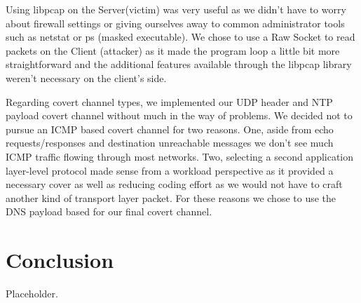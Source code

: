 \documentclass[titlepage]{article}
\begin{document}
Using libpcap on the Server(victim) was very useful as we didn't have to worry about firewall settings or giving ourselves away to common administrator tools such as netstat or ps (masked executable).  We chose to use a Raw Socket to read packets on the Client (attacker) as it made the program loop a little bit more straightforward and the additional features available through the libpcap library weren't necessary on the client's side.

Regarding covert channel types, we implemented our UDP header and NTP payload covert channel without much in the way of problems.  We decided not to pursue an ICMP based covert channel for two reasons. One, aside from echo requests/responses and destination unreachable messages we don't see much ICMP traffic flowing through most networks. Two, selecting a second application layer-level protocol made sense from a workload perspective as it provided a necessary cover as well as reducing coding effort as we would not have to craft another kind of transport layer packet.  For these reasons we chose to use the DNS payload based for our final covert channel.

\section{Conclusion}

Placeholder.
\end{document}

